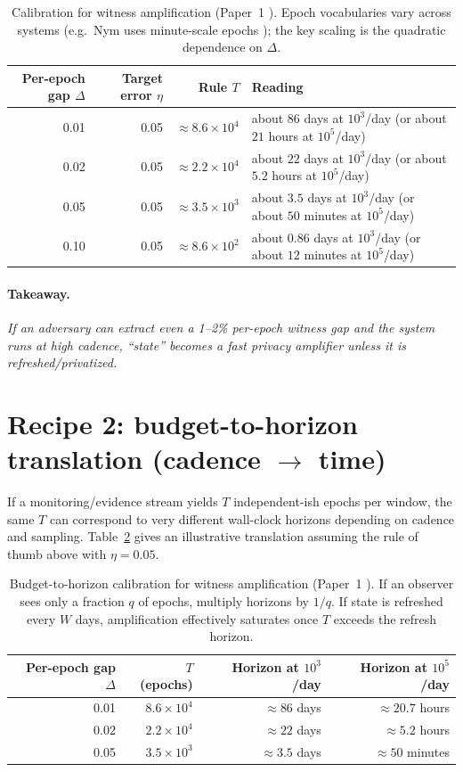 \documentclass[11pt]{article}
\newcommand{\takeaway}[1]{\paragraph{Takeaway.}\emph{#1}}
\begin{document}
\begin{table}[h]
\centering
\small
\begin{tabularx}{\linewidth}{@{}rrr>{\raggedright\arraybackslash}X@{}}
\toprule
Per-epoch gap $\Delta$ & Target error $\eta$ & Rule $T$ & Reading \\
\midrule
0.01 & 0.05 & $\approx 8.6\times 10^4$ & about $86$ days at $10^3$/day (or about $21$ hours at $10^5$/day) \\
0.02 & 0.05 & $\approx 2.2\times 10^4$ & about $22$ days at $10^3$/day (or about $5.2$ hours at $10^5$/day) \\
0.05 & 0.05 & $\approx 3.5\times 10^3$ & about $3.5$ days at $10^3$/day (or about $50$ minutes at $10^5$/day) \\
0.10 & 0.05 & $\approx 8.6\times 10^2$ & about $0.86$ days at $10^3$/day (or about $12$ minutes at $10^5$/day) \\
\bottomrule
\end{tabularx}
\caption{Calibration for witness amplification (Paper~1 \cite{state1}). Epoch vocabularies vary across systems (e.g.\ Nym uses minute-scale epochs \cite{nym_cryptoecon_reward_sharing}); the key scaling is the quadratic dependence on $\Delta$.}
\label{tab:calibration}
\end{table}

\takeaway{If an adversary can extract even a 1--2\% per-epoch witness gap and the system runs at high cadence, ``state'' becomes a fast privacy amplifier unless it is refreshed/privatized.}

\section{Recipe 2: budget-to-horizon translation (cadence \texorpdfstring{$\rightarrow$}{->} time)}
If a monitoring/evidence stream yields $T$ independent-ish epochs per window, the same $T$ can correspond to very different wall-clock horizons depending on cadence and sampling.
Table~\ref{tab:budget-horizon} gives an illustrative translation assuming the rule of thumb above with $\eta=0.05$.

\begin{table}[h]
\centering
\begin{tabular}{@{}rrrr@{}}
\toprule
Per-epoch gap $\Delta$ & $T$ (epochs) & Horizon at $10^3$/day & Horizon at $10^5$/day \\
\midrule
0.01 & $8.6\times 10^4$ & $\approx 86$ days & $\approx 20.7$ hours \\
0.02 & $2.2\times 10^4$ & $\approx 22$ days & $\approx 5.2$ hours \\
0.05 & $3.5\times 10^3$ & $\approx 3.5$ days & $\approx 50$ minutes \\
\bottomrule
\end{tabular}
\caption{Budget-to-horizon calibration for witness amplification (Paper~1 \cite{state1}). If an observer sees only a fraction $q$ of epochs, multiply horizons by $1/q$. If state is refreshed every $W$ days, amplification effectively saturates once $T$ exceeds the refresh horizon.}
\label{tab:budget-horizon}
\end{table}
\end{document}
